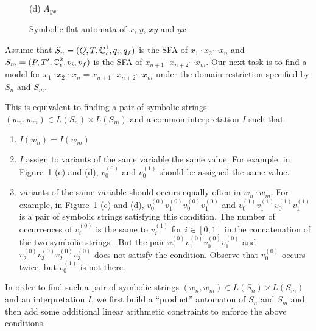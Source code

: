 \documentclass{llncs}
\begin{document}
\begin{figure}
\begin{minipage}[t]{0.28\textwidth}
	
	\centering
	(d) $A_{yx}$
	\end{minipage}

	\caption{Symbolic flat automata of $x$, $y$, $xy$ and $yx$}
	\label{fig:sfa}
\end{figure}

Assume that $S_n=(Q,T,\mbox{$\mathbb{C}$}^1_\epsilon,q_i,q_f)$ is the SFA of $x_1\cdot x_2 \cdots x_n$ and $S_m=(P,T',\mbox{$\mathbb{C}$}^2_\epsilon,p_i,p_f)$ is the SFA of $x_{n+1}\cdot x_{n+2} \cdots x_m$. Our next task is to find a model for $x_1\cdot x_2 \cdots x_n = x_{n+1}\cdot x_{n+2} \cdots x_m$ under the domain restriction specified by $S_n$ and $S_m$. 

This is equivalent to finding a pair of symbolic strings $(w_n,w_m) \in L(S_n)\times L(S_m)$ and a common interpretation $I$ such that 
\begin{enumerate}
	\item $I(w_n)=I(w_m)$
	\item $I$ assign to variants of the same variable the same value. For example, in Figure~\ref{fig:sfa} (c) and (d), $v_0^{(0)}$ and $v_0^{(1)}$ should be assigned the same value.
	\item variants of the same variable should occurs equally often in $w_n\cdot w_m$. For example, in Figure~\ref{fig:sfa} (c) and (d), $v_0^{(0)}v_1^{(0)}v_0^{(0)}v_1^{(0)}$ and $v_0^{(1)}v_1^{(1)}v_0^{(1)}v_1^{(1)}$ is a pair of symbolic strings satisfying this condition. The number of occurrences of $v_i^{(0)}$ is the same to $v_i^{(1)}$ for $i\in[0,1]$ in the concatenation of the two symbolic strings .
	But the pair $v_0^{(0)}v_1^{(0)}v_0^{(0)}v_1^{(0)}$ and $v_2^{(0)}v_3^{(0)}v_2^{(0)}v_3^{(0)}$ does not satisfy the condition. Observe that $v_0^{(0)}$ occurs twice, but $v_0^{(1)}$ is not there.
\end{enumerate}

In order to find such a pair of symbolic strings $(w_n,w_m) \in L(S_n)\times L(S_m)$ and an interpretation $I$, we first build a ``product'' automaton of $S_n$ and $S_m$ and then add some additional linear arithmetic constraints to enforce the above conditions.
\end{document}
